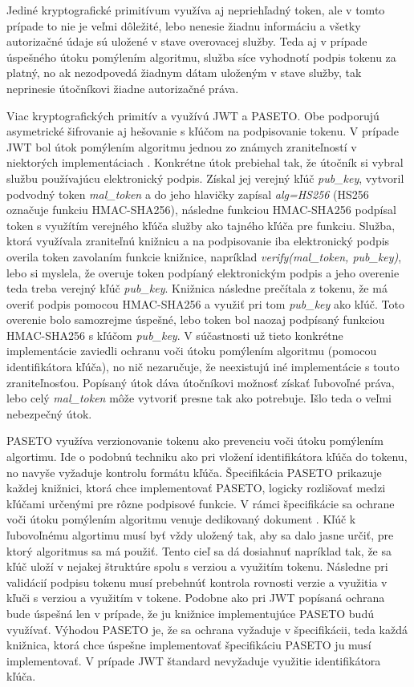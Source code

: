 Jediné kryptografické primitívum využíva aj nepriehľadný token, ale v tomto prípade to nie je veľmi dôležité, lebo nenesie žiadnu informáciu a všetky autorizačné údaje sú uložené v stave overovacej služby. Teda aj v prípade úspešného útoku pomýlením algoritmu, služba síce vyhodnotí podpis tokenu za platný, no ak nezodpovedá žiadnym dátam uloženým v stave služby, tak neprinesie útočníkovi žiadne autorizačné práva.

Viac kryptografických primitív a využívú JWT a PASETO. Obe podporujú asymetrické šifrovanie aj hešovanie s kľúčom na podpisovanie tokenu. V prípade JWT bol útok pomýlením algoritmu jednou zo známych zraniteľností v niektorých implementáciach \cite{jwt_vul}. Konkrétne útok prebiehal tak, že útočník si vybral službu používajúcu elektronický podpis. Získal jej verejný kľúč \textit{pub\_key}, vytvoril podvodný token \textit{mal\_token} a do jeho hlavičky zapísal \textit{alg=HS256} (HS256 označuje funkciu HMAC-SHA256), následne funkciou HMAC-SHA256 podpísal token s využítím verejného kľúča služby ako tajného kľúča pre funkciu. Služba, ktorá využívala zraniteľnú knižnicu a na podpisovanie iba elektronický podpis overila token zavolaním funkcie knižnice, napríklad \textit{verify(mal\_token, pub\_key)}, lebo si myslela, že overuje token podpíaný elektronickým podpis a jeho overenie teda treba verejný kľúč \textit{pub\_key}. Knižnica následne prečítala z tokenu, že má overiť podpis pomocou HMAC-SHA256 a využiť pri tom \textit{pub\_key} ako kľúč. Toto overenie bolo samozrejme úspešné, lebo token bol naozaj podpísaný funkciou HMAC-SHA256 s kľúčom \textit{pub\_key}. V súčastnosti už tieto konkrétne implementácie zaviedli ochranu voči útoku pomýlením algoritmu (pomocou identifikátora kľúča), no nič nezaručuje, že neexistujú iné implementácie s touto zraniteľnosťou. Popísaný útok dáva útočníkovi možnosť získať ľubovoľné práva, lebo celý \textit{mal\_token} môže vytvoriť presne tak ako potrebuje. Išlo teda o veľmi nebezpečný útok.

PASETO využíva verzionovanie tokenu ako prevenciu voči útoku pomýlením algortimu. Ide o podobnú techniku ako pri vložení identifikátora kľúča do tokenu, no navyše vyžaduje kontrolu formátu kľúča. Špecifikácia PASETO \cite{paseto_git} prikazuje každej knižnici, ktorá chce implementovať PASETO, logicky rozlišovať medzi kľúčami určenými pre rôzne podpisové funkcie. V rámci špecifikácie sa ochrane voči útoku pomýlením algoritmu venuje dedikovaný dokument \cite{alg_lucidity}. Kľúč k ľubovoľnému algortimu musí byť vždy uložený tak, aby sa dalo jasne určiť, pre ktorý algoritmus sa má použiť. Tento cieľ sa dá dosiahnuť napríklad tak, že sa kľúč uloží v nejakej štruktúre spolu s verziou a využitím tokenu. Následne pri validácií podpisu tokenu musí prebehnúť kontrola rovnosti verzie a využitia v kľuči s verziou a využitím v tokene. Podobne ako pri JWT popísaná ochrana bude úspešná len v prípade, že ju knižnice implementujúce PASETO budú využívať. Výhodou PASETO je, že sa ochrana vyžaduje v špecifikácii, teda každá knižnica, ktorá chce úspešne implementovať špecifikáciu PASETO ju musí implementovať. V prípade JWT štandard \cite{jwt_rfc} nevyžaduje využitie identifikátora kľúča.

